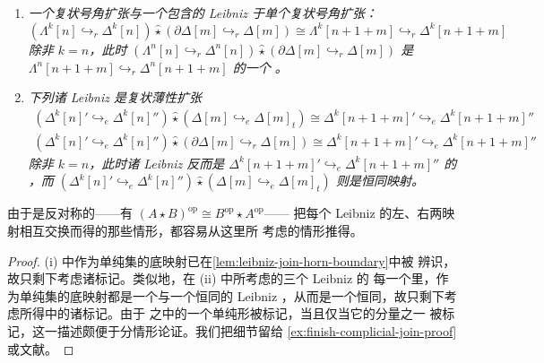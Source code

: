 \begin{lemma}\label{lem:leibniz-join-complicial}
\begin{enumerate}[label=(\roman*)]
\item \emph{一个复状号角扩张与一个\trBoundary{}包含的 Leibniz \trJoin%
\trIsomorphism{}于单个复状号角扩张：}
\begin{equation*}
(\Lambda^{k}[n]\hookrightarrow_{r}\Delta^{k}[n])\mathbin{\hat{\star}}
(\partial\Delta[m]\hookrightarrow_{r}\Delta[m])
\cong
\Lambda^{k}[n+1+m]\hookrightarrow_{r}\Delta^{k}[n+1+m]
\end{equation*}
\emph{除非 $k=n$，此时
$(\Lambda^{n}[n]\hookrightarrow_{r}\Delta^{n}[n])\mathbin{\hat{\star}} (\partial\Delta[m]\hookrightarrow_{r}\Delta[m])$
是 $\Lambda^{n}[n+1+m]\hookrightarrow_{r}\Delta^{n}[n+1+m]$ 的一个%
\trPushout。}
\item \emph{下列诸 Leibniz \trJoin{}是复状薄性扩张}
\begin{gather*}
(\Delta^{k}[n]'\hookrightarrow_{e}\Delta^{k}[n]'')\mathbin{\hat{\star}}
(\Delta[m]\hookrightarrow_{e}\Delta[m]_{t})
\cong
\Delta^{k}[n+1+m]'\hookrightarrow_{e}\Delta^{k}[n+1+m]''\\
(\Delta^{k}[n]'\hookrightarrow_{e}\Delta^{k}[n]'')\mathbin{\hat{\star}}
(\partial\Delta[m]\hookrightarrow_{r}\Delta[m])
\cong
\Delta^{k}[n+1+m]'\hookrightarrow_{e}\Delta^{k}[n+1+m]''
\end{gather*}
\emph{除非 $k=n$，此时诸 Leibniz \trJoin{}反而是
$\Delta^{k}[n+1+m]'\hookrightarrow_{e}\Delta^{k}[n+1+m]''$ 的%
\trPushout，而
$(\Delta^{k}[n]'\hookrightarrow_{e}\Delta^{k}[n]'')\mathbin{\hat{\star}} (\Delta[m]\hookrightarrow_{e}\Delta[m]_{t})$
则是恒同映射。}
\end{enumerate}
\end{lemma}

由于\trJoin{}是反对称的——有
$(A\star B)^{\mathrm{op}}\cong B^{\mathrm{op}}\star A^{\mathrm{op}}$——
把每个 Leibniz \trJoin{}的左、右两映射相互交换而得的那些情形，都容易从这里所%
考虑的情形推得。

\begin{proof}
(i) 中作为单纯集的底映射已在\cref{lem:leibniz-join-horn-boundary}中被%
辨识，故只剩下考虑诸标记。类似地，在 (ii) 中所考虑的三个 Leibniz \trJoin{}的%
每一个里，作为单纯集的底映射都是一个\trMonomorphism{}与一个恒同的%
Leibniz \trJoin，从而是一个恒同，故只剩下考虑所得\trEntireInclusion{}中的诸标记。由于%
\trMarkedSimplicialSet{}之\trJoin{}中的一个单纯形被标记，当且仅当它的分量之一
被标记，这一描述颇便于分情形论证。我们把细节留给%
\cref{ex:finish-complicial-join-proof}或文献\cite{bib129,bib38}。
\end{proof}

